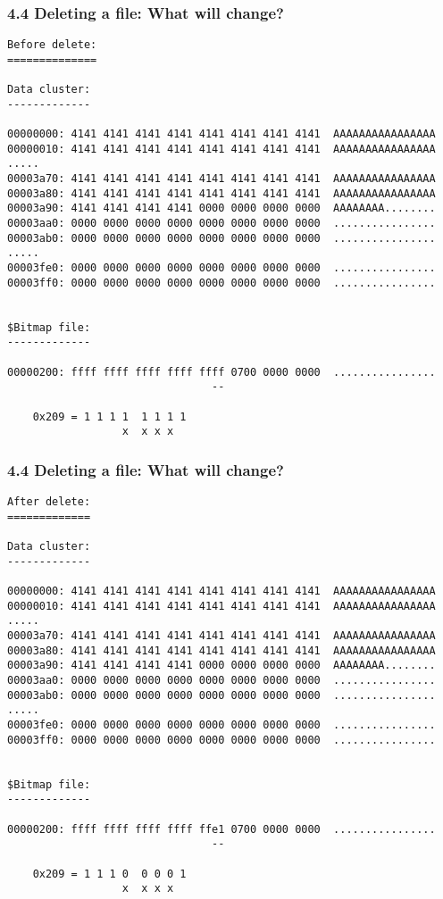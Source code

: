 \begin{frame}[fragile]
  \frametitle{4.4 Deleting a file: What will change?}
  \begin{lstlisting}[basicstyle=\tiny]
Before delete:
==============
  
Data cluster:
-------------

00000000: 4141 4141 4141 4141 4141 4141 4141 4141  AAAAAAAAAAAAAAAA
00000010: 4141 4141 4141 4141 4141 4141 4141 4141  AAAAAAAAAAAAAAAA
.....
00003a70: 4141 4141 4141 4141 4141 4141 4141 4141  AAAAAAAAAAAAAAAA
00003a80: 4141 4141 4141 4141 4141 4141 4141 4141  AAAAAAAAAAAAAAAA
00003a90: 4141 4141 4141 4141 0000 0000 0000 0000  AAAAAAAA........
00003aa0: 0000 0000 0000 0000 0000 0000 0000 0000  ................
00003ab0: 0000 0000 0000 0000 0000 0000 0000 0000  ................
.....
00003fe0: 0000 0000 0000 0000 0000 0000 0000 0000  ................
00003ff0: 0000 0000 0000 0000 0000 0000 0000 0000  ................


$Bitmap file:
-------------

00000200: ffff ffff ffff ffff ffff 0700 0000 0000  ................
                                --

	0x209 = 1 1 1 1  1 1 1 1
	              x  x x x
  \end{lstlisting}
\end{frame}


\begin{frame}[fragile]
  \frametitle{4.4 Deleting a file: What will change?}
  \begin{lstlisting}[basicstyle=\tiny]
After delete:
=============
  
Data cluster:
-------------

00000000: 4141 4141 4141 4141 4141 4141 4141 4141  AAAAAAAAAAAAAAAA
00000010: 4141 4141 4141 4141 4141 4141 4141 4141  AAAAAAAAAAAAAAAA
.....
00003a70: 4141 4141 4141 4141 4141 4141 4141 4141  AAAAAAAAAAAAAAAA
00003a80: 4141 4141 4141 4141 4141 4141 4141 4141  AAAAAAAAAAAAAAAA
00003a90: 4141 4141 4141 4141 0000 0000 0000 0000  AAAAAAAA........
00003aa0: 0000 0000 0000 0000 0000 0000 0000 0000  ................
00003ab0: 0000 0000 0000 0000 0000 0000 0000 0000  ................
.....
00003fe0: 0000 0000 0000 0000 0000 0000 0000 0000  ................
00003ff0: 0000 0000 0000 0000 0000 0000 0000 0000  ................


$Bitmap file:
-------------

00000200: ffff ffff ffff ffff ffe1 0700 0000 0000  ................
                                --

	0x209 = 1 1 1 0  0 0 0 1
	              x  x x x
  \end{lstlisting}
\end{frame}


